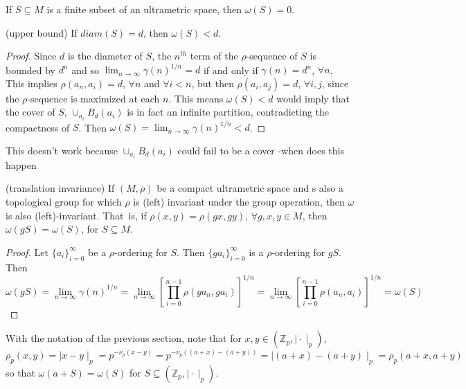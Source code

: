 \begin{proposition}
	If $S \subseteq M$ is a finite subset of an ultrametric space, then $\omega(S) =0$.
\end{proposition}


\begin{proposition}
	(upper bound) If $diam(S) = d$, then $\omega(S) < d$.
\end{proposition}

\begin{proof}
	Since $d$ is the diameter of $S$, the $n^{th}$ term of the $\rho$-sequence of $S$ is bounded by $d^n$ and so $ \lim_{n\to\infty} \gamma(n)^{1/n}=d$ if and only if $\gamma(n)=d^n$, $\forall n$. This implies $\rho(a_n, a_i) = d$, $\forall n$ and $\forall i < n$, but then $\rho(a_i,a_j)=d$, $\forall i,j$, since the $\rho$-sequence is maximized at each $n$. This means $\omega(S) < d$ would imply that the cover of $S$, $\cup_{a_i} B_d(a_i)$ is in fact an infinite partition, contradicting the compactness of $S$. Then  $\omega(S)= \lim_{n\to\infty} \gamma(n)^{1/n}<d$. 
\end{proof}

This doesn't work because  $\cup_{a_i} B_d(a_i)$  could fail to be a cover -when does this happen


\begin{proposition}
	(translation invariance) If $(M, \rho)$ be a compact ultrametric space and s also a topological group for which $\rho$ is (left) invariant under the group operation, then $\omega$ is also (left)-invariant. That\ is, if $\rho(x,y)=\rho(gx,gy)$, $ \forall g,x,y \in M$, then $\omega(gS)=\omega(S)$, for $S \subseteq M$.	
\end{proposition}

\begin{proof}
	Let $\{a_i\}_{i=0}^\infty$ be a $\rho$-ordering for $S$. Then $\{ga_i\}_{i=0}^\infty$ is a $\rho$-ordering for $gS$. Then $$\omega(gS) = \lim_{n\to\infty} \gamma(n)^{1/n} =  \lim_{n\to\infty} [\prod_{i=0}^{n-1} \rho(ga_n,ga_i)]^{1/n} = \lim_{n\to\infty} [\prod_{i=0}^{n-1} \rho(a_n,a_i)]^{1/n}	 = \omega(S)$$
\end{proof}	

\begin{example}
	With the notation of the previous section, note that for $x,y \in (\mathbb{Z}_p, \mid \cdot \mid_p)$, $\rho_p(x,y) = \mid x - y \mid_p = p^{-\nu_p(x-y)} = p^{-\nu_p((a+x)-(a+y))} =  \mid (a+x) - (a+y) \mid_p = \rho_p(a+x,a+y)$ so that $\omega(a+S) = \omega(S)$ for $S \subseteq (\mathbb{Z}_p, \mid \cdot \mid_p)$.
\end{example}

